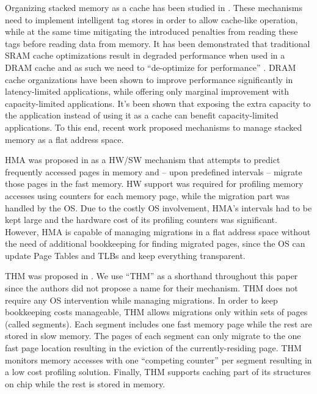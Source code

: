 Organizing stacked memory as a cache has been studied in \cite{qureshi-micro2012,BEAR,BIMODAL,citadel,tagless-dram-cache,UNISON}. These mechanisms need to implement intelligent tag stores in order to allow cache-like operation, while at the same time mitigating the introduced penalties from reading these tags before reading data from memory. It has been demonstrated that traditional SRAM cache optimizations result in degraded performance when used in a DRAM cache and as such we need to ``de-optimize for performance'' \cite{qureshi-micro2012}. DRAM cache organizations have been shown to improve performance significantly in latency-limited applications, while offering only marginal improvement with capacity-limited applications. It's been shown that exposing the extra capacity to the application instead of using it as a cache can benefit capacity-limited applications. To this end, recent work \cite{meswani-HPCA21,sim-micro2014,cameo} proposed mechanisms to manage stacked memory as a flat address space. 

HMA was proposed in \cite{meswani-HPCA21} as a HW/SW mechanism that attempts to predict frequently accessed pages in memory and -- upon predefined intervals -- migrate those pages in the fast memory. HW support was required for profiling memory accesses using counters for each memory page, while the migration part was handled by the OS. Due to the costly OS involvement, HMA's intervals had to be kept large and the hardware cost of its profiling counters was significant. However, HMA is capable of managing migrations in a flat address space without the need of additional bookkeeping for finding migrated pages, since the OS can update Page Tables and TLBs and keep everything transparent.

THM was proposed in \cite{sim-micro2014}. We use ``THM'' as a shorthand throughout this paper since the authors did not propose a name for their mechanism. THM does not require any OS intervention while managing migrations. In order to keep bookkeeping costs manageable, THM allows migrations only within sets of pages (called segments). Each segment includes one fast memory page while the rest are stored in slow memory. The pages of each segment can only migrate to the one fast page location resulting in the eviction of the currently-residing page. THM monitors memory accesses with one ``competing counter'' per segment resulting in a low cost profiling solution. Finally, THM supports caching part of its structures on chip while the rest is stored in memory.

